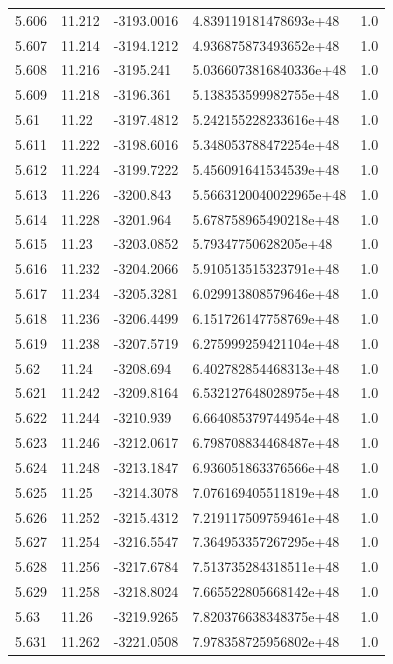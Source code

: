 \begin{tabular}{lllll}
5.606 & 11.212 & -3193.0016 & 4.839119181478693e+48 & 1.0 \\
5.607 & 11.214 & -3194.1212 & 4.936875873493652e+48 & 1.0 \\
5.608 & 11.216 & -3195.241 & 5.0366073816840336e+48 & 1.0 \\
5.609 & 11.218 & -3196.361 & 5.138353599982755e+48 & 1.0 \\
5.61 & 11.22 & -3197.4812 & 5.242155228233616e+48 & 1.0 \\
5.611 & 11.222 & -3198.6016 & 5.348053788472254e+48 & 1.0 \\
5.612 & 11.224 & -3199.7222 & 5.456091641534539e+48 & 1.0 \\
5.613 & 11.226 & -3200.843 & 5.5663120040022965e+48 & 1.0 \\
5.614 & 11.228 & -3201.964 & 5.678758965490218e+48 & 1.0 \\
5.615 & 11.23 & -3203.0852 & 5.79347750628205e+48 & 1.0 \\
5.616 & 11.232 & -3204.2066 & 5.910513515323791e+48 & 1.0 \\
5.617 & 11.234 & -3205.3281 & 6.029913808579646e+48 & 1.0 \\
5.618 & 11.236 & -3206.4499 & 6.151726147758769e+48 & 1.0 \\
5.619 & 11.238 & -3207.5719 & 6.275999259421104e+48 & 1.0 \\
5.62 & 11.24 & -3208.694 & 6.402782854468313e+48 & 1.0 \\
5.621 & 11.242 & -3209.8164 & 6.532127648028975e+48 & 1.0 \\
5.622 & 11.244 & -3210.939 & 6.664085379744954e+48 & 1.0 \\
5.623 & 11.246 & -3212.0617 & 6.798708834468487e+48 & 1.0 \\
5.624 & 11.248 & -3213.1847 & 6.936051863376566e+48 & 1.0 \\
5.625 & 11.25 & -3214.3078 & 7.076169405511819e+48 & 1.0 \\
5.626 & 11.252 & -3215.4312 & 7.219117509759461e+48 & 1.0 \\
5.627 & 11.254 & -3216.5547 & 7.364953357267295e+48 & 1.0 \\
5.628 & 11.256 & -3217.6784 & 7.513735284318511e+48 & 1.0 \\
5.629 & 11.258 & -3218.8024 & 7.665522805668142e+48 & 1.0 \\
5.63 & 11.26 & -3219.9265 & 7.820376638348375e+48 & 1.0 \\
5.631 & 11.262 & -3221.0508 & 7.978358725956802e+48 & 1.0 \\

\end{tabular}

